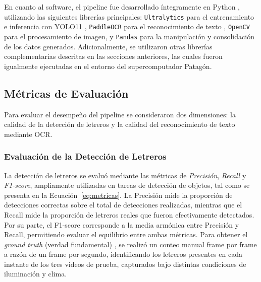 \documentclass[runningheads]{llncs}
\begin{document}
En cuanto al software, el pipeline fue desarrollado íntegramente en 
Python \cite{python2026}, utilizando las siguientes librerías 
principales: \texttt{Ultralytics} para el entrenamiento e inferencia con 
YOLO11 \cite{yolo11_ultralytics}, \texttt{PaddleOCR} para el reconocimiento 
de texto \cite{paddleocr}, \texttt{OpenCV} \cite{opencv} para el procesamiento de imagen, y \texttt{Pandas} \cite{pandas} para la manipulación y 
consolidación de los datos generados. Adicionalmente, se utilizaron 
otras librerías complementarias descritas en las secciones anteriores, 
las cuales fueron igualmente ejecutadas en el entorno del 
supercomputador Patagón.


\subsection{Métricas de Evaluación}
Para evaluar el desempeño del pipeline se consideraron dos dimensiones:
 la calidad de la detección de letreros y la calidad del reconocimiento
  de texto mediante OCR.

\subsubsection{Evaluación de la Detección de Letreros}
\label{subsec:evaluacion-deteccion}

La detección de letreros se evaluó mediante las métricas de \textit{Precisión}, \textit{Recall} y \textit{F1-score}, ampliamente utilizadas en tareas de detección de objetos, tal como se presenta en la Ecuación~\ref{eq:metricas}.
La Precisión mide la proporción de detecciones correctas sobre el total de detecciones realizadas, mientras que el Recall mide la proporción de letreros reales
que fueron efectivamente detectados. Por su parte, el F1-score corresponde a la media armónica entre Precisión y Recall, permitiendo evaluar el equilibrio entre ambas métricas.
Para obtener el \textit{ground truth} (verdad fundamental) \cite{ibm_ground_truth}, se realizó un conteo manual frame por frame a razón de un frame por segundo, identificando los 
letreros presentes en cada instante de los tres videos de prueba, capturados bajo distintas condiciones de iluminación y clima.
\end{document}
